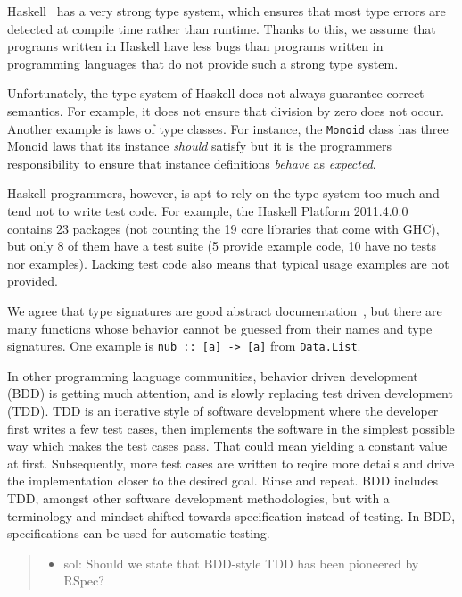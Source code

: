 \documentclass[preprint]{sigplanconf}
\begin{document}
Haskell~\cite{haskell} has a very strong type system, which ensures that most type errors are
detected at compile time rather than runtime.  Thanks to this, we assume that
programs written in Haskell have less bugs than programs written in programming
languages that do not provide such a strong type system.

Unfortunately, the type system of Haskell does not always guarantee
correct semantics.
For example, it does not ensure that division by zero does not occur.
Another example is laws of type classes.
For instance, the {\tt Monoid} class has three Monoid laws
that its instance \emph{should} satisfy
but
it is the programmers responsibility to ensure that
instance definitions \emph{behave} as \emph{expected}.

Haskell programmers, however, is apt to rely on the type system too
much and tend not to write test code.  For example, the Haskell
Platform 2011.4.0.0 contains 23 packages (not counting the 19 core
libraries that come with GHC), but only 8 of them have a test suite (5
provide example code, 10 have no tests nor examples).  Lacking test
code also means that typical usage examples are not provided.

We agree that type signatures are good abstract documentation~\cite{free}, but
there are many functions whose behavior cannot be guessed from their names and
type signatures.  One example is \verb|nub :: [a] -> [a]| from {\tt Data.List}.

In other programming language communities, behavior driven development
(BDD) is getting much attention, and is slowly replacing test driven
development (TDD).  TDD is an iterative style of software development
where the developer first writes a few test cases, then implements the
software in the simplest possible way which makes the test cases pass.
That could mean yielding a constant value at first.  Subsequently,
more test cases are written to reqire more details and drive the
implementation closer to the desired goal.  Rinse and repeat.  BDD
includes TDD, amongst other software development methodologies, but
with a terminology and mindset  shifted towards specification instead
of testing.  In BDD, specifications can be used for automatic testing.

\begin{quote}\begin{itemize}
    \item sol: Should we state that BDD-style TDD has been pioneered
        by RSpec?
\end{itemize}\end{quote}
\end{document}
